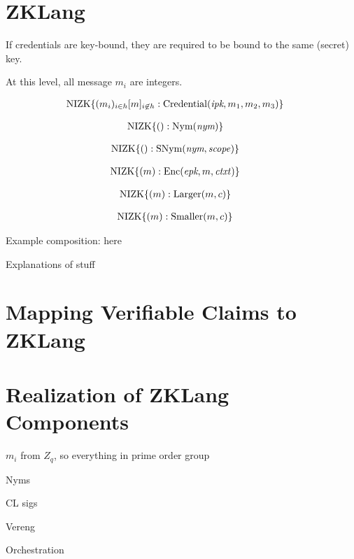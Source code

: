 


\section{ZKLang}

\newcommand{\NIZK}{\operatorname{NIZK}}

If credentials are key-bound, they are required to be bound to the same (secret) key. 

At this level, all message $m_i$ are integers.

\begin{multline}
\NIZK\lbrace(m_i)_{i\in h}[m]_{i\not\in h}: \operatorname{Credential}( \emph{ipk}, m_1, m_2, m_3) \rbrace\shoveleft\
\end{multline}


\begin{multline}
\NIZK\lbrace(): \operatorname{Nym}( \emph{nym}) \rbrace\shoveleft\
\end{multline}


\begin{multline}
\NIZK\lbrace(): \operatorname{SNym}( \emph{nym}, \mathit{scope}) \rbrace\shoveleft\
\end{multline}


\begin{multline}
\NIZK\lbrace(m): \operatorname{Enc}( \emph{epk}, m, \mathit{ctxt}) \rbrace\shoveleft\
\end{multline}

\begin{multline}
\NIZK\lbrace(m): \operatorname{Larger}(m, c) \rbrace\shoveleft\
\end{multline}

\begin{multline}
\NIZK\lbrace(m): \operatorname{Smaller}(m, c) \rbrace\shoveleft\
\end{multline}


Example composition: here 

Explanations of stuff



\section{Mapping Verifiable Claims to ZKLang}




\section{Realization of ZKLang Components}

$m_i$ from $Z_q$, so everything in prime order group

Nyms

CL sigs

Vereng

Orchestration
